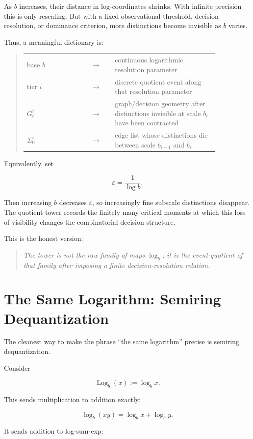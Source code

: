 \documentclass[11pt]{article}
\makeatletter
\newenvironment{claimbox}
  {\begin{quote}\itshape}
  {\end{quote}}
\newenvironment{dictionary}
  {\begin{quote}\begin{tabular}{@{}p{0.30\linewidth}c p{0.54\linewidth}@{}}}
  {\end{tabular}\end{quote}}
\makeatother
\begin{document}
As \(b\) increases, their distance in log-coordinates shrinks. With infinite
precision this is only rescaling. But with a fixed observational threshold,
decision resolution, or dominance criterion, more distinctions become invisible
as \(b\) varies.

Thus, a meaningful dictionary is:

\begin{dictionary}
base \(b\)
  & \(\longrightarrow\) &
continuous logarithmic resolution parameter \\
tier \(i\)
  & \(\longrightarrow\) &
discrete quotient event along that resolution parameter \\
\(G_t^i\)
  & \(\longrightarrow\) &
graph/decision geometry after distinctions invisible at scale \(b_i\)
have been contracted \\
\(\Sigma_0^i\)
  & \(\longrightarrow\) &
edge list whose distinctions die between scale \(b_{i-1}\) and \(b_i\)
\end{dictionary}

Equivalently, set

\[
\varepsilon
=
\frac{1}{\log b}.
\]

Then increasing \(b\) decreases \(\varepsilon\), so increasingly fine subscale
distinctions disappear. The quotient tower records the finitely many critical
moments at which this loss of visibility changes the combinatorial decision
structure.

This is the honest version:

\begin{claimbox}
The tower is not the raw family of maps \(\log_b\); it is the event-quotient of
that family after imposing a finite decision-resolution relation.
\end{claimbox}

\section{The Same Logarithm: Semiring Dequantization}

The cleanest way to make the phrase ``the same logarithm'' precise is semiring
dequantization.

Consider

\[
\operatorname{Log}_b(x):=\log_b x.
\]

This sends multiplication to addition exactly:

\[
\log_b(xy)=\log_b x+\log_b y.
\]

It sends addition to log-sum-exp:
\end{document}
